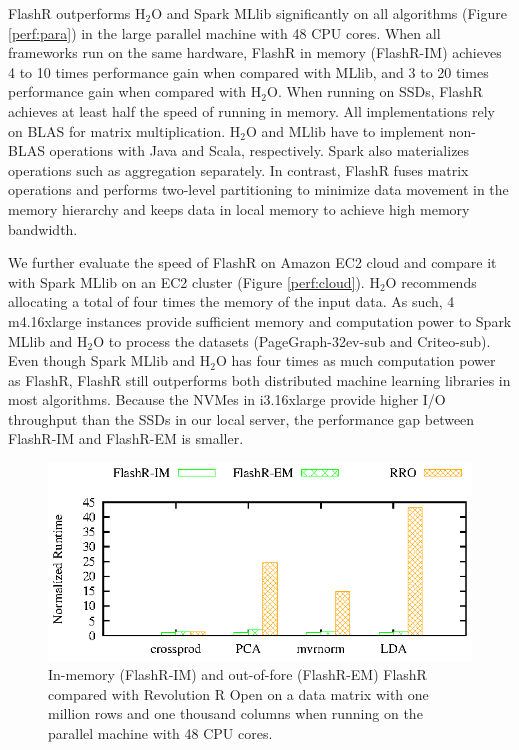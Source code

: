 FlashR outperforms H$_2$O and Spark MLlib significantly on all algorithms
(Figure \ref{perf:para}) in the large parallel machine with 48 CPU cores.
When all frameworks run on the same hardware, FlashR in memory (FlashR-IM)
achieves 4 to 10 times performance gain when compared
with MLlib, and 3 to 20 times performance gain when compared with H$_2$O.
When running on SSDs, FlashR achieves at least half the speed of running in
memory. All implementations rely on BLAS for matrix multiplication. H$_2$O
and MLlib have to implement non-BLAS operations with Java and Scala,
respectively. Spark also materializes operations such as aggregation
separately. In contrast,
FlashR fuses matrix operations and performs two-level partitioning to
minimize data movement in the memory hierarchy and keeps data in local
memory to achieve high memory bandwidth.

We further evaluate the speed of FlashR on Amazon EC2 cloud and compare it with
Spark MLlib on an EC2 cluster (Figure \ref{perf:cloud}). H$_2$O recommends
allocating a total of four times the memory of the input data. As such,
4 m4.16xlarge instances provide sufficient memory and computation power to
Spark MLlib and H$_2$O to process the datasets (PageGraph-32ev-sub and Criteo-sub).
Even though Spark MLlib and H$_2$O has four times as much computation power as FlashR, FlashR
still outperforms both distributed machine learning libraries in most algorithms.
Because the NVMes in i3.16xlarge provide higher I/O throughput than the SSDs
in our local server, the performance gap between FlashR-IM and FlashR-EM is
smaller.

\begin{figure}[b]
  \vspace{-10pt}
	\begin{center}
		\footnotesize
		\includegraphics{FlashMatrix_figs/FlashR-vs-RRO.eps}
		\vspace{-10pt}
		\caption{In-memory (FlashR-IM) and out-of-fore (FlashR-EM) FlashR
		compared with Revolution R Open on a data matrix with one million rows
		and one thousand columns when running on the parallel machine with
		48 CPU cores.}
		\label{fig:fmR}
	\end{center}
  \vspace{-15pt}
\end{figure}

